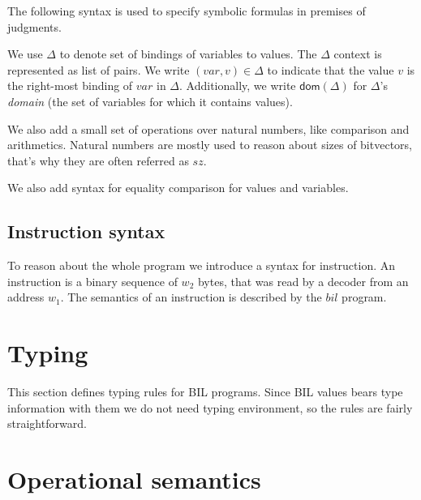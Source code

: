 \documentclass[11pt]{article}
\begin{document}
The following syntax is used to specify symbolic formulas in premises
of judgments.

We use $\Delta$ to denote set of bindings of variables to values. The
$\Delta$ context is represented as list of pairs. We write
$(var,v) \in \Delta$ to indicate that the value $v$ is the right-most
binding of $var$ in $\Delta$.  Additionally, we write
$\mathsf{dom}(\Delta)$ for $\Delta$'s {\em domain} (the set of
variables for which it contains values).

We also add a small set of operations over natural numbers, like
comparison and arithmetics. Natural numbers are mostly used to reason
about sizes of bitvectors, that's why they are often referred as
$\mathit{sz}$.

We also add syntax for equality comparison for values and variables.


\ottgrammartabular{
\ottdelta\ottinterrule
}

\ottgrammartabular{
\ottformula\ottinterrule
}

\ottgrammartabular{
\ottnat\ottinterrule
}

\subsection{Instruction syntax}
\label{sec:insn}

To reason about the whole program we introduce a syntax for
instruction. An instruction is a binary sequence of $\mathit{w_2}$
bytes, that was read by a decoder from an address $\mathit{w_1}$. The
semantics of an instruction is described by the $\mathit{bil}$ program.

\ottgrammartabular{
\ottinsn\ottinterrule
}

\clearpage

\section{Typing}
\label{sec:typing}

This section defines typing rules for BIL programs. Since BIL values
bears type information with them we do not need typing environment, so
the rules are fairly straightforward.

\ottdefnstypingXXstmt

\ottdefnstypingXXexp

\clearpage


\section{Operational semantics}
\end{document}
